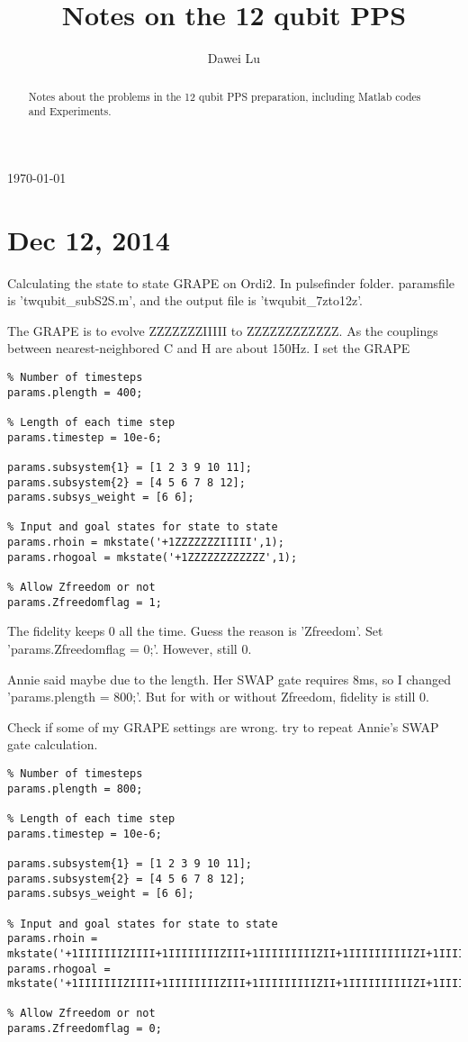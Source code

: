 \documentclass[prl,onecolumn]{revtex4-1}
\begin{document}
\title{Notes on the 12 qubit PPS}
\author{Dawei Lu}

\begin{abstract}
Notes about the problems in the 12 qubit PPS preparation, including Matlab codes and Experiments.
\end{abstract}
\today

\maketitle

\section{Dec 12, 2014}

Calculating the state to state GRAPE on Ordi2. In pulsefinder folder. paramsfile is 'twqubit\_subS2S.m', and the output file is 'twqubit\_7zto12z'.

The GRAPE is to evolve ZZZZZZZIIIII to ZZZZZZZZZZZZ. As the couplings between nearest-neighbored C and H are about 150Hz. I set the GRAPE 

\begin{lstlisting}
% Number of timesteps
params.plength = 400;

% Length of each time step
params.timestep = 10e-6;

params.subsystem{1} = [1 2 3 9 10 11];
params.subsystem{2} = [4 5 6 7 8 12];
params.subsys_weight = [6 6];

% Input and goal states for state to state
params.rhoin = mkstate('+1ZZZZZZZIIIII',1);
params.rhogoal = mkstate('+1ZZZZZZZZZZZZ',1);

% Allow Zfreedom or not
params.Zfreedomflag = 1;
\end{lstlisting}

The fidelity keeps 0 all the time. Guess the reason is 'Zfreedom'. Set 'params.Zfreedomflag = 0;'. However, still 0.

Annie said maybe due to the length. Her SWAP gate requires 8ms, so I changed 'params.plength = 800;'. But for with or without Zfreedom, fidelity is still 0.

Check if some of my GRAPE settings are wrong. try to repeat Annie's SWAP gate calculation.

\begin{lstlisting}
% Number of timesteps
params.plength = 800;

% Length of each time step
params.timestep = 10e-6;

params.subsystem{1} = [1 2 3 9 10 11];
params.subsystem{2} = [4 5 6 7 8 12];
params.subsys_weight = [6 6];

% Input and goal states for state to state
params.rhoin = mkstate('+1IIIIIIIZIIII+1IIIIIIIIZIII+1IIIIIIIIIZII+1IIIIIIIIIIZI+1IIIIIIIIIIIZ',1);
params.rhogoal = mkstate('+1IIIIIIIZIIII+1IIIIIIIIZIII+1IIIIIIIIIZII+1IIIIIIIIIIZI+1IIIIIIZIIIIZ',1);

% Allow Zfreedom or not
params.Zfreedomflag = 0;
\end{lstlisting}
\end{document}
